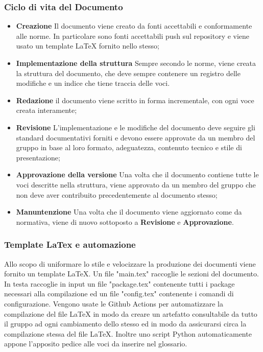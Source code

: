 	    \subsubsection{Ciclo di vita del Documento}
	    \begin{itemize}
	        \item \textbf{Creazione} Il documento viene creato da fonti accettabili e conformamente alle norme. In particolare sono fonti accettabili push sul repository e viene usato un template LaTeX fornito nello stesso;
	        \item \textbf{Implementazione della struttura} Sempre secondo le norme, viene creata la struttura del documento, che deve sempre contenere un registro delle modifiche e un indice che tiene traccia delle voci.
	        \item \textbf{Redazione} il documento viene scritto in forma incrementale, con ogni voce creata interamente;
	        \item \textbf{Revisione} L'implementazione e le modifiche del documento deve seguire gli standard documentativi forniti e devono essere approvate da un membro del gruppo in base al loro formato, adeguatezza, contenuto tecnico e stile di presentazione;
	        \item \textbf{Approvazione della versione} Una volta che il documento contiene tutte le voci descritte nella struttura, viene approvato da un membro del gruppo che non deve aver contribuito precedentemente al documento stesso;
	        \item \textbf{Manuntenzione} Una volta che il documento viene aggiornato come da normativa, viene di nuovo sottoposto a \textbf{Revisione} e \textbf{Approvazione}.
	    \end{itemize}
    
    
    	
	    
	    \subsubsection{Template LaTex e automazione}
	    Allo scopo di uniformare lo stile e velocizzare la produzione dei documenti viene fornito un template LaTeX.
	    Un file "main.tex" raccoglie le sezioni del documento. In testa raccoglie in input un file "package.tex" contenente tutti i package necessari alla compilazione ed un file "config.tex" contenente i comandi di configurazione.
	    Vengono usate le Github Actions per automatizzare la compilazione del file LaTeX in modo da creare un artefatto consultabile da tutto il gruppo ad ogni cambiamento dello stesso ed in modo  da assicurarsi circa la compilazione stessa del file LaTeX. Inoltre uno script Python automaticamente appone l'apposito pedice alle voci da inserire nel glossario.
	    
